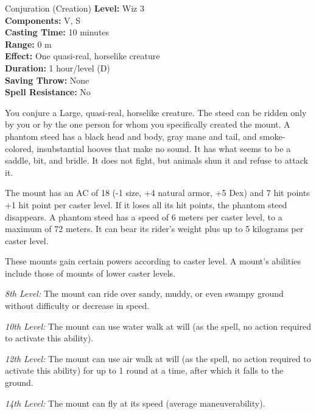 {Conjuration (Creation)}
{
	\textbf{Level:}
	Wiz 3\\
	\textbf{Components:}
	V, S\\
	\textbf{Casting Time:}
	10 minutes\\
	\textbf{Range:}
	0 m\\
	\textbf{Effect:}
	One quasi-real, horselike creature\\
	\textbf{Duration:}
	1 hour/level (D)\\
	\textbf{Saving Throw:}
	None\\
	\textbf{Spell Resistance:}
	No\\
}
{
	You conjure a Large, quasi-real, horselike creature. The steed can be ridden only by you or by the one person for whom you specifically created the mount. A phantom steed has a black head and body, gray mane and tail, and smoke-colored, insubstantial hooves that make no sound. It has what seems to be a saddle, bit, and bridle. It does not fight, but animals shun it and refuse to attack it.

	The mount has an AC of 18 (-1 size, +4 natural armor, +5 Dex) and 7 hit points +1 hit point per caster level. If it loses all its hit points, the phantom steed disappears. A phantom steed has a speed of 6 meters per caster level, to a maximum of 72 meters. It can bear its rider's weight plus up to 5 kilograms per caster level.

	These mounts gain certain powers according to caster level. A mount's abilities include those of mounts of lower caster levels.

	\textit{8th Level:}
	The mount can ride over sandy, muddy, or even swampy ground without difficulty or decrease in speed.

	\textit{10th Level:}
	The mount can use water walk at will (as the spell, no action required to activate this ability).

	\textit{12th Level:}
	The mount can use air walk at will (as the spell, no action required to activate this ability) for up to 1 round at a time, after which it falls to the ground.

	\textit{14th Level:}
	The mount can fly at its speed (average maneuverability).

}
